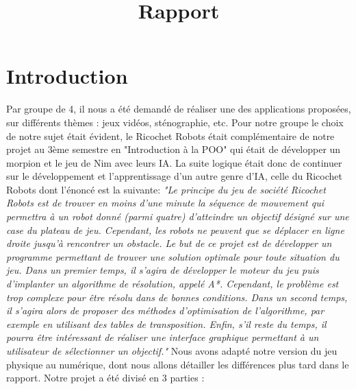 \documentclass{rapportECL}
\title{Rapport}
\begin{document}




        
\fairemarges
\fairepagedegarde
\tabledematieres 


\section{Introduction}
Par groupe de 4, il nous a été demandé de réaliser une des applications proposées, sur différents thèmes : jeux vidéos, sténographie, etc.
\newline
\newline
Pour notre groupe le choix de notre sujet était évident, le Ricochet Robots était complémentaire de notre projet au 3ème semestre en "Introduction à la POO" qui était de développer un morpion et le jeu de Nim avec leurs IA. La suite logique était donc de continuer sur le développement et l'apprentissage d'un autre genre d'IA, celle du Ricochet Robots dont l'énoncé est la suivante:
\newline
\newline
\emph{
"Le principe du jeu de société Ricochet Robots est de trouver en moins d'une minute la séquence de mouvement qui permettra à un robot donné (parmi quatre) d'atteindre un objectif désigné sur une case du plateau de jeu. Cependant, les robots ne peuvent que se déplacer en ligne droite jusqu'à rencontrer un obstacle. Le but de ce projet est de développer un programme permettant de trouver une solution optimale pour toute situation du jeu. Dans un premier temps, il s'agira de développer le moteur du jeu puis d'implanter un algorithme de résolution, appelé A*. Cependant, le problème est trop complexe pour être résolu dans de bonnes conditions. Dans un second temps, il s'agira alors de proposer des méthodes d'optimisation de l'algorithme, par exemple en utilisant des tables de transposition. Enfin, s'il reste du temps, il pourra être intéressant de réaliser une interface graphique permettant à un utilisateur de sélectionner un objectif."}
\newline
\newline
Nous avons adapté notre version du jeu physique au numérique, dont nous allons détailler les différences plus tard dans le rapport.
\newline
\newline
Notre projet a été divisé en 3 parties : 
\end{document}
